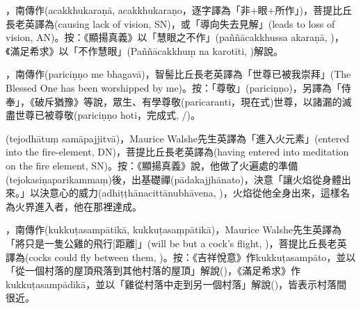 \startitemgroup[noteitems]
\item{}，南傳作(acakkhukaraṇā, acakkhukaraṇo，逐字譯為「非+眼+所作」)，菩提比丘長老英譯為(causing lack of vision, SN)，或「導向失去見解」(leads to loss of vision, AN)。按：《顯揚真義》以「慧眼之不作」(paññācakkhussa akaraṇā, )，《滿足希求》以「不作慧眼」(Paññācakkhuṃ na karotīti, )解說。
\stopitemgroup

\startitemgroup[noteitems]
\item{}，南傳作(pariciṇṇo me bhagavā)，智髻比丘長老英譯為「世尊已被我崇拜」(The Blessed One has been worshipped by me)。按：「尊敬」(pariciṇṇo)，另譯為「侍奉」，《破斥猶豫》等說，眾生、有學尊敬(paricaranti，現在式)世尊，以諸漏的滅盡世尊已被尊敬(pariciṇṇo hoti，完成式, /)。
\stopitemgroup

\startitemgroup[noteitems]
\item{}(tejodhātuṃ samāpajjitvā)，Maurice Walshe先生英譯為「進入火元素」(entered into the fire-element, DN)，菩提比丘長老英譯為(having entered into meditation on the fire element, SN)。按：《顯揚真義》說，他做了火遍處的準備(tejokasiṇaparikammaṃ)後，出基礎禪(pādakajjhānato)，決意「讓火焰從身體出來。」以決意心的威力(adhiṭṭhānacittānubhāvena, )，火焰從他全身出來，這樣名為火界進入者，他在那裡達成。
\stopitemgroup

\startitemgroup[noteitems]
\item{}，南傳作(kukkuṭasampātikā, kukkuṭasaṃpātikā)，Maurice Walshe先生英譯為「將只是一隻公雞的飛行[距離]」(will be but a cock's flight, )，菩提比丘長老英譯為(cocks could fly between them, )。按：《吉祥悅意》作kukkuṭasampāto，並以「從一個村落的屋頂飛落到其他村落的屋頂」解說()，《滿足希求》作kukkuṭasampādikā，並以「雞從村落中走到另一個村落」解說()，皆表示村落間很近。
\stopitemgroup

